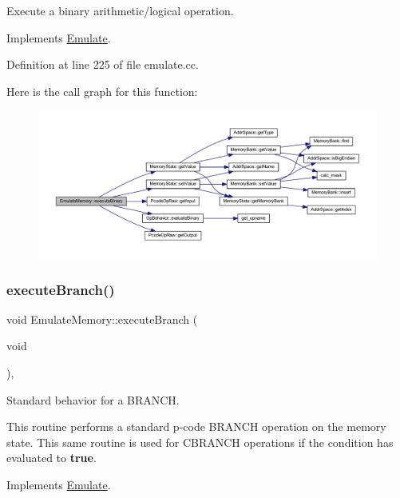 Execute a binary arithmetic/logical operation. 



Implements \mbox{\hyperlink{class_emulate_a278171740465666a64442716187a1505}{Emulate}}.



Definition at line 225 of file emulate.\+cc.

Here is the call graph for this function\+:
\nopagebreak
\begin{figure}[H]
\begin{center}
\leavevmode
\includegraphics[width=350pt]{class_emulate_memory_a1570bf6221f1d26978873823f94ce469_cgraph}
\end{center}
\end{figure}
\mbox{\label{class_emulate_memory_ac69d1f93ffc1a86d3486af34bb520302}} 
\subsubsection{\texorpdfstring{executeBranch()}{executeBranch()}}
{\footnotesize\ttfamily void Emulate\+Memory\+::execute\+Branch (\begin{DoxyParamCaption}\item[{void}]{ }\end{DoxyParamCaption})\hspace{0.3cm}{\ttfamily [protected]}, {\ttfamily [virtual]}}



Standard behavior for a B\+R\+A\+N\+CH. 

This routine performs a standard p-\/code B\+R\+A\+N\+CH operation on the memory state. This same routine is used for C\+B\+R\+A\+N\+CH operations if the condition has evaluated to {\bfseries{true}}. 

Implements \mbox{\hyperlink{class_emulate_a145cee350a9273250a970c9387ecbd81}{Emulate}}.



